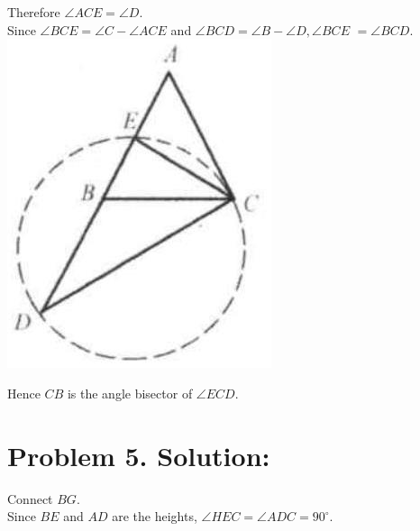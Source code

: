 \documentclass[10pt]{article}
\begin{document}
Therefore \(\angle A C E=\angle D\).\\
Since \(\angle B C E=\angle C-\angle A C E\) and \(\angle B C D=\angle B-\angle D, \angle B C E\) \(=\angle B C D\).\\
\includegraphics[max width=\textwidth, center]{2025_04_17_97bc1f7e44d93c271a88g-209(1)}

Hence \(C B\) is the angle bisector of \(\angle E C D\).

\section*{Problem 5. Solution:}
Connect \(B G\).\\
Since \(B E\) and \(A D\) are the heights, \(\angle H E C=\angle A D C=90^{\circ}\).
\end{document}
